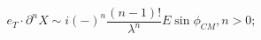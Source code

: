 \begin{equation}
e_{T}\cdot \partial ^{n}X\sim i(-)^{n}\frac{(n-1)!}{\lambda ^{n}}E\sin \phi
_{CM},n>0;
\end{equation}

